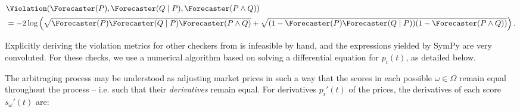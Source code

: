 \begin{align*}
&\Violation(\priceP,\priceQgivenP,\pricePandQ) \\ &= -2\log\left(\sqrt{\priceP\priceQgivenP\pricePandQ}+\sqrt{(1-\priceP\priceQgivenP)(1-\pricePandQ)}\right).
\end{align*}








Explicitly deriving the violation metrics for other checkers from  is infeasible by hand, and the expressions yielded by SymPy are very convoluted. For these checks, we use a numerical algorithm based on solving a differential equation for $p_i(t)$, as detailed below.

The arbitraging process may be understood as adjusting market prices in such a way that the scores in each possible $\omega\in\Omega$ remain equal throughout the process -- i.e. such that their \emph{derivatives} remain equal. For derivatives $p_i'(t)$ of the prices, the derivatives of each score $s_\omega'(t)$ are:

